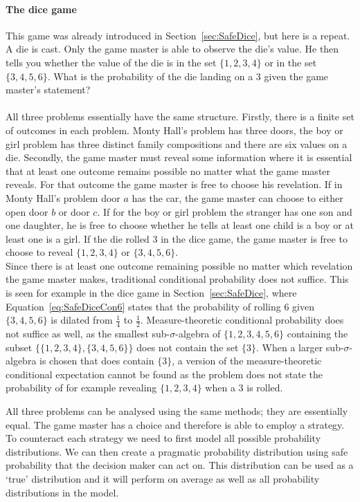 \documentclass[a4paper]{report}
\theoremstyle{plain}
\theoremstyle{definition}
\theoremstyle{remark}
\numberwithin{equation}{chapter}
\DeclareMathOperator{\1}{\mathbbm{1}}
\begin{document}
\paragraph{The dice game}
This game was already introduced in Section~\ref{sec:SafeDice}, but here is a repeat. A die is cast. Only the game master is able to observe the die's value. He then tells you whether the value of the die is in the set $\{1,2,3,4\}$ or in the set $\{3,4,5,6\}$. What is the probability of the die landing on a $3$ given the game master's statement?

\paragraph{}
All three problems essentially have the same structure. Firstly, there is a finite set of outcomes in each problem. Monty Hall's problem has three doors, the boy or girl problem has three distinct family compositions and there are six values on a die. Secondly, the game master must reveal some information where it is essential that at least one outcome remains possible no matter what the game master reveals. For that outcome the game master is free to choose his revelation. If in Monty Hall's problem door $a$ has the car, the game master can choose to either open door $b$ or door $c$. If for the boy or girl problem the stranger has one son and one daughter, he is free to choose whether he tells at least one child is a boy or at least one is a girl. If the die rolled 3 in the dice game, the game master is free to choose to reveal $\{1,2,3,4\}$ or $\{3,4,5,6\}$.\\
Since there is at least one outcome remaining possible no matter which revelation the game master makes, traditional conditional probability does not suffice. This is seen for example in the dice game in Section~\ref{sec:SafeDice}, where Equation~\ref{eq:SafeDiceCon6} states that the probability of rolling $6$ given $\{3,4,5,6\}$ is dilated from $\frac{1}{4}$ to $\frac{1}{2}$. Measure-theoretic conditional probability does not suffice as well, as the smallest sub-$\sigma$-algebra of $\{1,2,3,4,5,6\}$ containing the subset $\{\{1,2,3,4\},\{3,4,5,6\}\}$ does not contain the set $\{3\}$. When a larger sub-$\sigma$-algebra is chosen that does contain $\{3\}$, a version of the measure-theoretic conditional expectation cannot be found as the problem does not state the probability of for example revealing $\{1,2,3,4\}$ when a $3$ is rolled.

All three problems can be analysed using the same methods; they are essentially equal. The game master has a choice and therefore is able to employ a strategy. To counteract each strategy we need to first model all possible probability distributions. We can then create a pragmatic probability distribution using safe probability that the decision maker can act on. This distribution can be used as a `true' distribution and it will perform on average as well as all probability distributions in the model.
\end{document}
